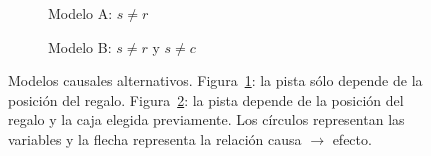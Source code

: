 \documentclass[a4paper,11pt]{book}
\theoremstyle{definition}
\begin{document}
\begin{figure}[ht!]
  \centering
  \begin{subfigure}[b]{0.48\textwidth}
  \centering
  \caption{Modelo A: $s \neq r$}
  \label{fig:modelo_causal_1}
  \end{subfigure}
  \begin{subfigure}[b]{0.48\textwidth}
  \centering
  \caption{Modelo B: $s \neq r$ y $s \neq c$}
  \label{fig:modelo_causal_2}
  \end{subfigure}
  \caption{Modelos causales alternativos. Figura~\ref{fig:modelo_causal_1}: la pista sólo depende de la posición del regalo. Figura~\ref{fig:modelo_causal_2}: la pista depende de la posición del regalo y la caja elegida previamente.
  Los círculos representan las variables y la flecha representa la relación causa $\rightarrow$ efecto.
  }
  \label{fig:modelos_causales}
\end{figure}
\end{document}
